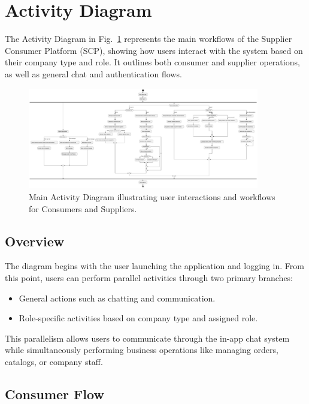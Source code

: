 \section{Activity Diagram}

The Activity Diagram in Fig.~\ref{fig:activity-diagram} represents the main workflows of the Supplier Consumer Platform (SCP), showing how users interact with the system based on their company type and role. It outlines both consumer and supplier operations, as well as general chat and authentication flows.

\begin{figure}[t]
\centering
\includegraphics[width=0.9\textwidth]{out/main-activity-diagram.pdf}
\caption{Main Activity Diagram illustrating user interactions and workflows for Consumers and Suppliers.}
\label{fig:activity-diagram}
\end{figure}

\subsection{Overview}

The diagram begins with the user launching the application and logging in. From this point, users can perform parallel activities through two primary branches:
\begin{itemize}
    \item General actions such as chatting and communication.
    \item Role-specific activities based on company type and assigned role.
\end{itemize}

This parallelism allows users to communicate through the in-app chat system while simultaneously performing business operations like managing orders, catalogs, or company staff.

\subsection{Consumer Flow}

